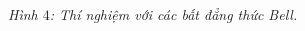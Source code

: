 \begin{multicols}{2}
\begin{figure}[H]
		\vspace*{-10pt}
	\end{figure}
	\centerline{\small\textit{\color{timhieukhoahoc}Hình $4$: Thí nghiệm với các bất đẳng thức Bell.}}
	\vskip 0.1cm
\end{multicols}